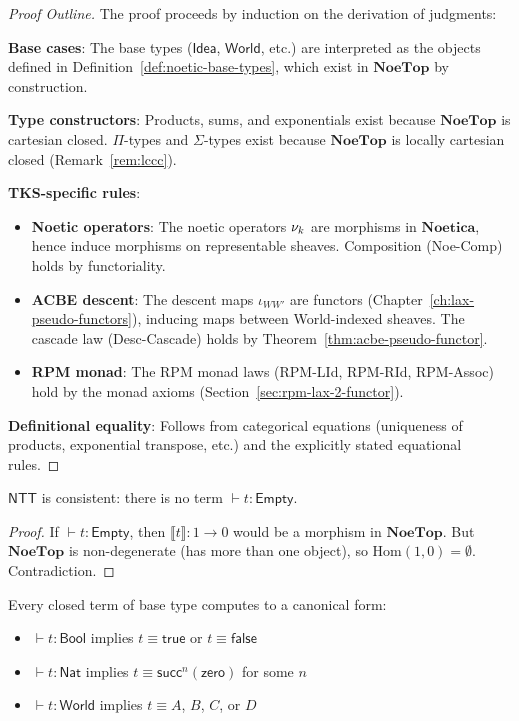 \begin{proof}[Proof Outline]
The proof proceeds by induction on the derivation of judgments:

\textbf{Base cases}: The base types ($\mathsf{Idea}$, $\mathsf{World}$, etc.) are
interpreted as the objects defined in Definition~\ref{def:noetic-base-types},
which exist in $\mathbf{NoeTop}$ by construction.

\textbf{Type constructors}: Products, sums, and exponentials exist because
$\mathbf{NoeTop}$ is cartesian closed. $\Pi$-types and $\Sigma$-types exist
because $\mathbf{NoeTop}$ is locally cartesian closed (Remark~\ref{rem:lccc}).

\textbf{TKS-specific rules}:
\begin{itemize}
  \item \textbf{Noetic operators}: The noetic operators $\nu_{k}$ are morphisms
        in $\mathbf{Noetica}$, hence induce morphisms on representable sheaves.
        Composition (Noe-Comp) holds by functoriality.
  \item \textbf{ACBE descent}: The descent maps $\iota_{WW'}$ are functors
        (Chapter~\ref{ch:lax-pseudo-functors}), inducing maps between World-indexed
        sheaves. The cascade law (Desc-Cascade) holds by Theorem~\ref{thm:acbe-pseudo-functor}.
  \item \textbf{RPM monad}: The RPM monad laws (RPM-LId, RPM-RId, RPM-Assoc)
        hold by the monad axioms (Section~\ref{sec:rpm-lax-2-functor}).
\end{itemize}

\textbf{Definitional equality}: Follows from categorical equations (uniqueness
of products, exponential transpose, etc.) and the explicitly stated equational
rules.
\end{proof}

\begin{corollary}
\label{cor:ntt-consistency}
$\mathsf{NTT}$ is consistent: there is no term $\vdash t : \mathsf{Empty}$.
\end{corollary}

\begin{proof}
If $\vdash t : \mathsf{Empty}$, then $\llbracket t \rrbracket : 1 \to 0$ would be a
morphism in $\mathbf{NoeTop}$. But $\mathbf{NoeTop}$ is non-degenerate (has
more than one object), so $\mathrm{Hom}(1, 0) = \emptyset$. Contradiction.
\end{proof}

\begin{corollary}
\label{cor:canonicity}
Every closed term of base type computes to a canonical form:
\begin{itemize}
  \item $\vdash t : \mathsf{Bool}$ implies $t \equiv \mathsf{true}$ or $t \equiv \mathsf{false}$
  \item $\vdash t : \mathsf{Nat}$ implies $t \equiv \mathsf{succ}^n(\mathsf{zero})$ for some $n$
  \item $\vdash t : \mathsf{World}$ implies $t \equiv A$, $B$, $C$, or $D$
\end{itemize}
\end{corollary}

